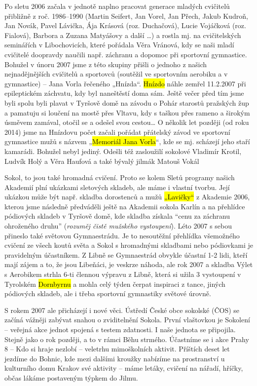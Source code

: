 Po sletu 2006 začala v jednotě naplno pracovat generace mladých
cvičitelů přibližně z roč. 1986--1990 (Martin Seifert, Jan Vorel, Jan
Přech, Jakub Kudroň, Jan Novák, Pavel Lávička, Ája Krásová (roz.
Duchačová), Lucie Vojáčková (roz. Fialová), Barbora a Zuzana Matyášovy a
další \ldots) a rostla mj. na cvičitelských seminářích v Libochovicích,
které pořádala Věra Vránová, kdy se naši mladí cvičitelé doopravdy
naučili např. záchranu a dopomoc při sportovní gymnastice. Bohužel v
únoru 2007 jsme z této skupiny přišli o jednoho z našich nejnadějnějších
cvičitelů a sportovců (soutěžil ve sportovním aerobiku a v gymnastice)
-- Jana Vorla řečeného „Hnízda``. \hl{Hnízdo} náhle zemřel 11.2.2007 při
epileptickém záchvatu, kdy byl naneštěstí doma sám. Ještě večer před tím
jsme byli spolu byli plavat v Tyršově domě na závodu o Pohár starostů
pražských žup a pamatuju si loučení na mostě přes Vltavu, kdy s taškou
přes rameno a širokým úsměvem zamával, otočil se a odešel svou
cestou\ldots{} O několik let později (od roku 2014) jsme na Hnízdovu
počet začali pořádat přátelský závod ve sportovní gymnastice mužů s
názvem „\hl{Memoriál Jana Vorla}``, kde se mj. scházejí jeho staří
kamarádi. Bohužel nebyl jediný. Odešli též zasloužilí sokolové Vladimír
Krotil, Ludvík Holý a Věra Haufová a také bývalý jilmák Matouš Vokál

Sokol, to jsou také hromadná cvičení. Proto se kolem Sletů programy
našich Akademií plní ukázkami sletových skladeb, ale máme i vlastní
tvorbu. Její ukázkou může být např. skladba dorostenců a mužů
\hl{„Lavičky``} z Akademie 2006, kterou jsme následně předváděli ještě
na Akademii sokola Karlín a na přehlídce pódiových skladeb v Tyršově
domě, kde skladba získala ``cenu za záchranu ohroženého druhu''
(\emph{rozuměj čistě mužského vystoupení}). Léto 2007 s sebou přineslo
také světovou Gymnaestrádu. Je to nesoutěžní přehlídka všemožného
cvičení ze všech koutů světa a Sokol s hromadnými skladbami nebo
pódiovkami je pravidelným účastníkem. Z Libně se Gymnaestrád obvykle
účastní 1-2 lidi, kteří mají zájem a to, že jsou Libeňáci, je veskrze
náhoda, ale rok 2007 a skladba Výlet s Aerobikem strhla 6-ti člennou
výpravu z Libně, která si užila 3 vystoupení v Tyrolském \hl{Dornbyrnu}
a mohla celý týden čerpat inspiraci z tance, jiných pódiových skladeb,
ale i třeba sportovní gymnastiky světové úrovně.

S rokem 2007 ale přicházejí i nové věci. Ústředí České obce sokolské
(ČOS) se začíná vážněji zabývat snahou o zviditelnění Sokola. První
vlaštovkou je Sokolení -- veřejná akce jednot spojená s testem
zdatnosti. I naše jednota se připojila. Stejně jako o rok později, a to
v rámci Běhu strmého. Účastníme se i akce Prahy 8 -- Kdo si hraje
nezlobí -- veletrhu mimoškolních aktivit. Příštích deset let jezdíme do
Bohnic, kde mezi dalšími kroužky nabízíme na prostranství u kulturního
domu Krakov své aktivity -- máme letáky, cvičení na nářadí, hříčky,
občas lákáme postaveným týpkem do Jilmu.

